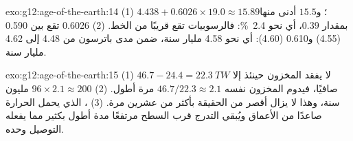 \begin{solution}{exo:g12:age-of-the-earth:14}
(1) $4.438 + 0.6026 \times 19.0 \approx 15.89$؛ و$15.5$ أدنى منها بمقدار $0.39$،
أي نحو \qty{2.4}{\percent}: فالرسوبيات تقع قريبًا من الخط. (2) 0.6026
تقع بين 0.590 (4.55) و0.610 (4.60): أي نحو 4.58 مليار سنة، ضمن
مدى باترسون من 4.48 إلى 4.62 مليار سنة.
\end{solution}

\begin{solution}{exo:g12:age-of-the-earth:15}
(1) لا يفقد المخزون حينئذ إلا $46.7 - 24.4 = \qty{22.3}{TW}$ صافيًا، فيدوم
المخزون نفسه $46.7/22.3 \approx 2.1$ مرة أطول. (2) $96 \times 2.1 \approx
200$ مليون سنة، وهذا لا يزال أقصر من الحقيقة بأكثر من عشرين مرة. (3) ، الذي يحمل الحرارة صاعدًا من الأعماق ويُبقي التدرج
قرب السطح مرتفعًا مدة أطول بكثير مما يفعله التوصيل وحده.
\end{solution}

